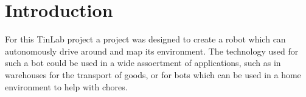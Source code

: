\section{Introduction}
For this TinLab project a project was designed to create a robot which can autonomously drive around and map its environment.
The technology used for such a bot could be used in a wide assoertment of applications, such as in warehouses for 
the transport of goods, or for bots which can be used in a home environment to help with chores.




